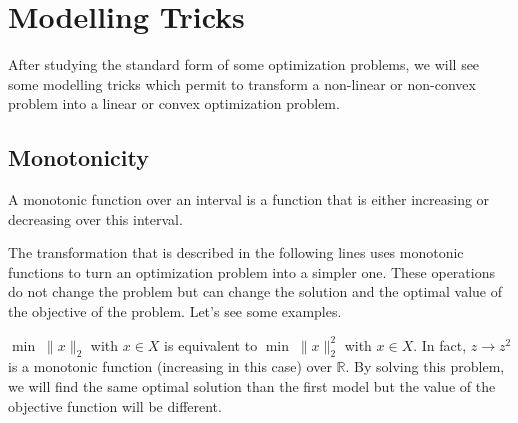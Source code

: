 %
%
%
%

\section{Modelling Tricks}

After studying the standard form of some optimization problems, we will see some model\-ling tricks which permit to transform a non-linear or non-convex problem into a linear or convex optimization problem. 

\subsection{Monotonicity}

\begin{definition}
A monotonic function over an interval is a function that is either increasing or decreasing over this interval.
\end{definition}

The transformation that is described in the following lines uses monotonic functions to turn an optimization problem into a simpler one. These operations do not change the problem but can change the solution and the optimal value of the objective of the problem. Let's see some examples.

\begin{example}
\begin{leftbar}
$\min \; \|x\|_{2}$ with $x \in X$ is equivalent to $\min \; \|x\|_{2}^{2}$ with $x \in X$. In fact, $z \rightarrow z^2$ is a monotonic function (increasing in this case) over $\mathbb{R}$. By solving this problem, we will find the same optimal solution than the first model but the value of the objective function will be different.
\end{leftbar}
\end{example}

